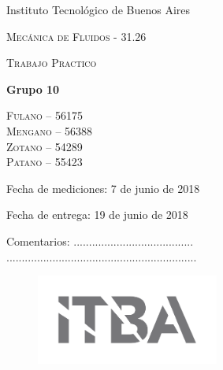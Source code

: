 \documentclass[10pt,titlepage]{article}
\begin{document}

\centering
{ \large Instituto Tecnológico de Buenos Aires  \par }
\vspace{2cm}
{\Large \scshape \sc Mecánica de Fluidos - 31.26 \par}
\vspace{2cm}
{\Huge \scshape \sc Trabajo Practico \par }
\vspace{1cm}
{\large \bf Grupo 10 \par}
\vspace{0cm}
\textsc{\large \sc Fulano -- 56175 \\ Mengano -- 56388 \\Zotano -- 54289 \\ Patano -- 55423}
\vspace{2cm}
{\par \large Fecha de mediciones: 7 de junio de 2018 \par}
\vspace{1cm}
{\large Fecha de entrega: 19 de junio de 2018\par}
\vspace{2.5cm}
{\large Comentarios: .......................................}\\
\vspace{1.2cm}
{\large ..............................................................}
\vspace{1cm}
\begin{figure}[htb!]
\centering
\includegraphics[width=6cm]{fig/logoitba.png}
\end{figure}
\end{document}
